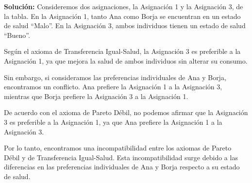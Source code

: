 \begin{enumerate}
	\textbf{Solución:} Consideremos dos asignaciones, la Asignación 1 y la Asignación 3, de la tabla. En la Asignación 1, tanto Ana como Borja se encuentran en un estado de salud “Malo”. En la Asignación 3, ambos individuos tienen un estado de salud “Bueno”.

Según el axioma de Transferencia Igual-Salud, la Asignación 3 es preferible a la Asignación 1, ya que mejora la salud de ambos individuos sin alterar su consumo.

Sin embargo, si consideramos las preferencias individuales de Ana y Borja, encontramos un conflicto. Ana prefiere la Asignación 1 a la Asignación 3, mientras que Borja prefiere la Asignación 3 a la Asignación 1.

De acuerdo con el axioma de Pareto Débil, no podemos afirmar que la Asignación 3 es preferible a la Asignación 1, ya que Ana prefiere la Asignación 1 a la Asignación 3.

Por lo tanto, encontramos una incompatibilidad entre los axiomas de Pareto Débil y de Transferencia Igual-Salud. Esta incompatibilidad surge debido a las diferencias en las preferencias individuales de Ana y Borja respecto a su estado de salud.


\end{enumerate}
